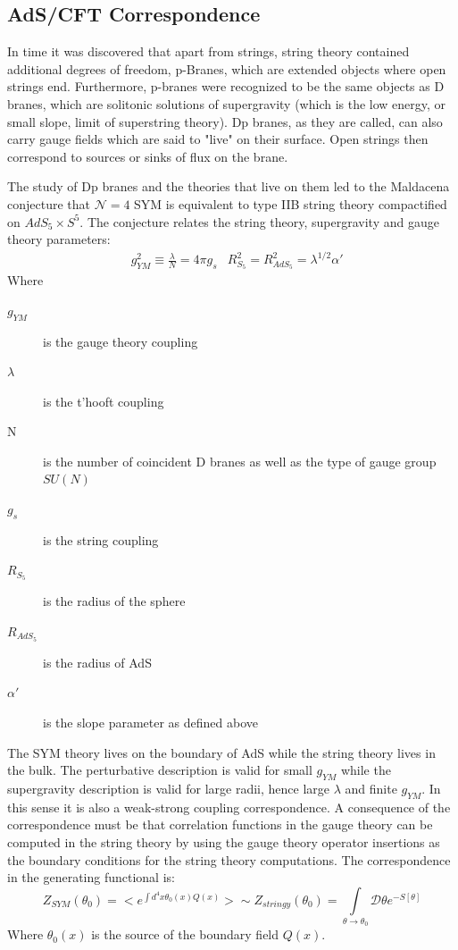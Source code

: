 \documentclass[11pt,a4paper]{article}
\begin{document}
\subsection{AdS/CFT Correspondence}

In time it was discovered that apart from strings, string theory contained additional degrees of freedom, p-Branes, which are extended objects where open strings end. Furthermore, p-branes were recognized to be the same objects as D branes, which are solitonic solutions of supergravity (which is the low energy, or small slope, limit of superstring theory). Dp branes, as they are called, can also carry gauge fields which are said to "live" on their surface. Open strings then correspond to sources or sinks of flux on the brane.

The study of Dp branes and the theories that live on them led to the Maldacena conjecture that $\mathcal{N}=4$ SYM is equivalent to type IIB string theory compactified on $AdS_5\times S^5$\cite{Maldacena97,Aharony11,Vecchia98}. The conjecture relates the string theory, supergravity and gauge theory parameters:
\begin{align}
&g_{YM}^2\equiv\frac{\lambda}{N}=4\pi g_s &R_{S_5}^2=R_{AdS_5}^2=\lambda^{1/2}\alpha'
\end{align}
Where
\begin{description}
\item[$g_{YM}$] is the gauge theory coupling
\item[$\lambda$] is the t'hooft coupling
\item[N] is the number of coincident D branes as well as the type of gauge group $SU\left(N\right)$
\item[$g_s$] is the string coupling
\item[$R_{S_5}$] is the radius of the sphere
\item[$R_{AdS_5}$] is the radius of AdS
\item[$\alpha'$] is the slope parameter as defined above
\end{description}

The SYM theory lives on the boundary of AdS while the string theory lives in the bulk. The perturbative description is valid for small $g_{YM}$ while the supergravity description is valid for large radii, hence large $\lambda$ and finite $g_{YM}$. In this sense it is also a weak-strong coupling correspondence. A consequence of the correspondence must be that correlation functions in the gauge theory can be computed in the string theory by using the gauge theory operator insertions as the boundary conditions for the string theory computations. The correspondence in the generating functional is:
\begin{equation}
Z_{SYM}\left(\theta_0\right)=< e^{\int d^4x\theta_0\left(x\right)Q\left(x\right)}>
\sim Z_{stringy}\left(\theta_0\right)=\int\limits_{\theta\rightarrow\theta_0}\mathcal{D}\theta e^{-S\left[\theta\right]}
\end{equation}
Where $\theta_0\left(x\right)$ is the source of the boundary field $Q\left(x\right)$.
\end{document}
